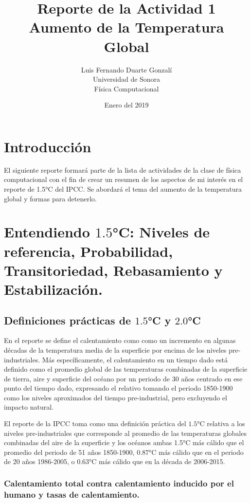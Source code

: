 \documentclass{article}
\title{\textbf{Reporte de la Actividad 1}\\ Aumento de la Temperatura Global}
\author{Luis Fernando Duarte Gonzalí \\ Universidad de Sonora \\ Física Computacional}
\date{Enero del 2019}
\begin{document}
\maketitle


\section{Introducción}
El siguiente reporte formará parte de la lista de actividades de la clase de física computacional con el fin de crear un resumen de los aspectos de mi interés en el reporte de 1.5°C del IPCC. Se abordará el tema del aumento de la temperatura global y formas para detenerlo.

\section{Entendiendo $1.5$°C: Niveles de referencia, Probabilidad, Transitoriedad, Rebasamiento y Estabilización.}

\subsection{Definiciones prácticas de $1.5$°C y $2.0$°C}
En el reporte se define el calentamiento como como un incremento en algunas décadas de la temperatura media de la superficie por encima de los niveles pre-industriales. Más específicamente, el calentamiento en un tiempo dado está definido como el promedio global de las temperaturas combinadas de la superficie de tierra, aire y superficie del océano por un periodo de 30 años centrado en ese punto del tiempo dado, expresando el relativo tomando el periodo 1850-1900 como los niveles aproximados del tiempo pre-industrial, pero excluyendo el impacto  natural. 

El reporte de la IPCC toma como una definición práctica del $1.5$°C relativa a los niveles pre-industriales que corresponde al promedio de las temperaturas globales combinadas del aire de la superficie y los océanos ambas 1.5°C más cálido que el promedio del periodo de 51 años 1850-1900, 0.87°C más cálido que en el periodo de 20 años 1986-2005, o 0.63°C más cálido que en la década de 2006-2015.

\subsubsection{Calentamiento total contra calentamiento inducido por el humano y tasas de calentamiento.}
\end{document}
